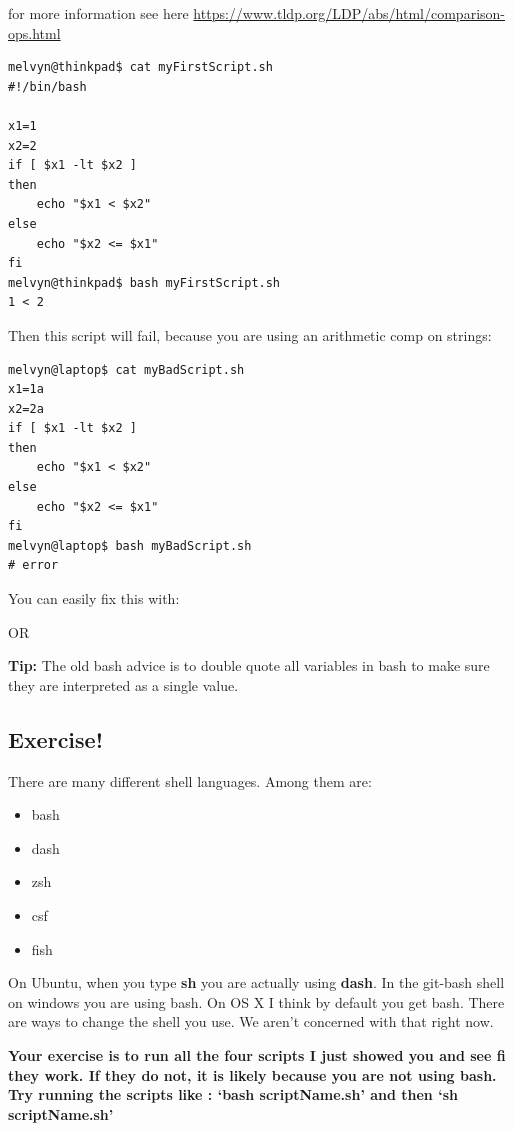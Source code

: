 \documentclass[10pt]{article}
\begin{document}
for more information see here
\url{https://www.tldp.org/LDP/abs/html/comparison-ops.html}


\begin{lstlisting}[style=term]
melvyn@thinkpad$ cat myFirstScript.sh
#!/bin/bash

x1=1
x2=2
if [ $x1 -lt $x2 ]        
then
    echo "$x1 < $x2"
else
    echo "$x2 <= $x1"
fi
melvyn@thinkpad$ bash myFirstScript.sh
1 < 2
\end{lstlisting}


Then this script will fail, because you are using an arithmetic comp on strings:

\begin{lstlisting}[style=term]
melvyn@laptop$ cat myBadScript.sh
x1=1a
x2=2a
if [ $x1 -lt $x2 ]        
then
    echo "$x1 < $x2"
else
    echo "$x2 <= $x1"
fi
melvyn@laptop$ bash myBadScript.sh
# error
\end{lstlisting}

You can easily fix this with:



OR




\textbf{Tip:} The old bash advice is to double quote all variables in bash to make sure they are interpreted as a single value.

\subsection{Exercise!}

There are many different shell languages. Among them are:

\begin{itemize}
\item bash
\item dash
\item zsh
\item csf
\item fish
\end{itemize}

On Ubuntu, when you type \textbf{sh} you are actually using \textbf{dash}. In
the git-bash shell on windows you are using bash. On OS X I think by default you
get bash. There are ways to change the shell you use. We aren't concerned with
that right now.

\textbf{Your exercise is to run all the four scripts I just showed you and see
fi they work. If they do not, it is likely because you are not using bash. Try
running the scripts like  : `bash scriptName.sh' and then `sh scriptName.sh'}
\end{document}
